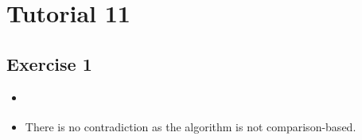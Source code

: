 \documentclass[english]{article}
\begin{document}

\pagestyle{fancy}
 \chead{}

\section*{Tutorial 11}
\subsection*{Exercise 1}
\begin{itemize}
\item
\begin{algorithmic}
  \ENDFOR
  \ENDFOR
	\ENDFOR
  \ENDFOR
\end{algorithmic}

\item There is no contradiction as the algorithm is not comparison-based.
\end{itemize}
\end{document}
